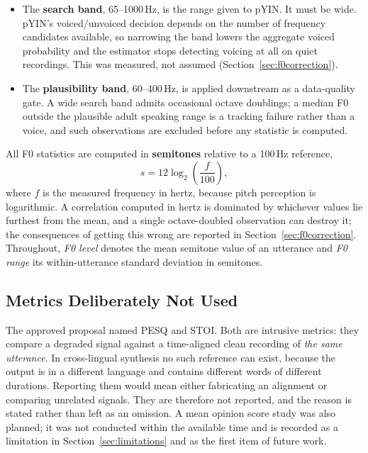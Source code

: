 \begin{itemize}
  \item The \textbf{search band}, 65--1000\,Hz, is the range given to pYIN. It must be wide.
        pYIN's voiced/unvoiced decision depends on the number of frequency candidates available,
        so narrowing the band lowers the aggregate voiced probability and the estimator stops
        detecting voicing at all on quiet recordings. This was measured, not assumed
        (Section~\ref{sec:f0correction}).
  \item The \textbf{plausibility band}, 60--400\,Hz, is applied downstream as a data-quality gate.
        A wide search band admits occasional octave doublings; a median F0 outside the plausible
        adult speaking range is a tracking failure rather than a voice, and such observations are
        excluded before any statistic is computed.
\end{itemize}

All F0 statistics are computed in \textbf{semitones} relative to a 100\,Hz reference,
\begin{equation}
s = 12\log_2\!\left(\frac{f}{100}\right),
\label{eq:semitones}
\end{equation}
where $f$ is the measured frequency in hertz, because pitch perception is logarithmic. A correlation computed in hertz is
dominated by whichever values lie furthest from the mean, and a single octave-doubled observation
can destroy it; the consequences of getting this wrong are reported in
Section~\ref{sec:f0correction}. Throughout, \emph{F0 level} denotes the mean semitone value of an
utterance and \emph{F0 range} its within-utterance standard deviation in semitones.

\subsection{Metrics Deliberately Not Used}
\label{sec:not_used}
The approved proposal named PESQ and STOI. Both are intrusive metrics: they compare a degraded
signal against a time-aligned clean recording of \emph{the same utterance}. In cross-lingual
synthesis no such reference can exist, because the output is in a different language and contains
different words of different durations. Reporting them would mean either fabricating an alignment
or comparing unrelated signals. They are therefore not reported, and the reason is stated rather
than left as an omission. A mean opinion score study was also planned; it was not conducted within
the available time and is recorded as a limitation in Section~\ref{sec:limitations} and as the
first item of future work.

